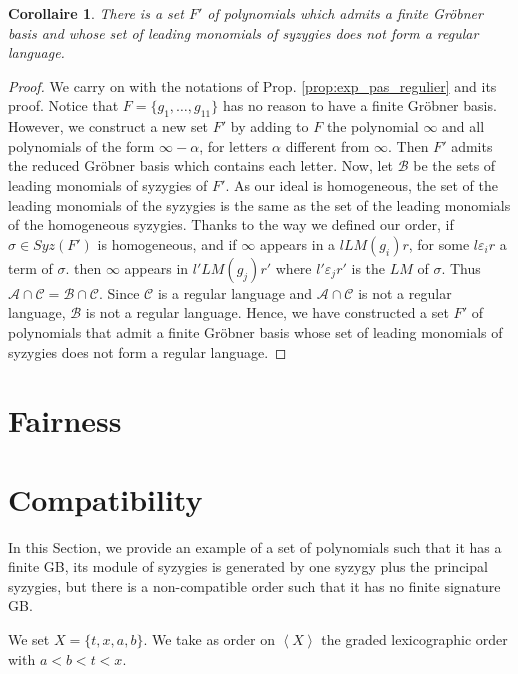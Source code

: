 \documentclass[sigconf]{acmart}
\theoremstyle{plain}
\newtheorem{cor}[lem]{Corollaire}
\theoremstyle{definition}
\theoremstyle{remark}
\newcommand{\LM}{LM}
\begin{document}
\begin{cor}
There is a set $F'$ of polynomials which
admits a finite Gröbner basis
and whose set of leading monomials of syzygies does not form a regular language. 
\end{cor}
\begin{proof}
We carry on with the notations of Prop. \ref{prop:exp_pas_regulier} and
its proof.
Notice that $F=\{g_1,\dots,g_{11}\}$ has no reason to have a finite Gröbner basis. However, we construct a new set $F'$ by adding to $F$ the polynomial $\infty$ and all polynomials of the form $\infty-\alpha$, for letters $\alpha$ different from $\infty$. Then $F'$ admits the reduced Gröbner basis which contains each letter.
Now, let $\mathscr{B}$ be the sets of leading monomials of syzygies of $F'$.
As our ideal is homogeneous,
the set of the
leading monomials of the syzygies
is the same as the set of the leading
monomials of the homogeneous syzygies.
Thanks to the way we defined our order,
if $\sigma \in Syz(F')$ is homogeneous,
and
if $\infty$ appears in a $l \LM(g_i) r$,
for some $l \varepsilon_i r$ 
a term of $\sigma.$ 
then 
$\infty$ appears in $l' \LM(g_j) r'$
where $l' \varepsilon_j r'$ is the $\LM$
of $\sigma.$
Thus $\mathscr{A} \cap \mathscr{C}=\mathscr{B} \cap \mathscr{C}$. Since $\mathscr{C}$ is a regular language and $\mathscr{A} \cap \mathscr{C}$ is not a regular language, $\mathscr{B}$ is not a regular language. Hence, we have constructed a set $F'$ of polynomials that admit a finite Gröbner basis whose set of leading monomials of syzygies does not form a regular language. 
\end{proof}


\section{Fairness}

\section{Compatibility}

In this Section,
we provide an example
of a set of polynomials
such that 
it has a finite GB,
its module of
syzygies is generated
by one syzygy plus
the principal syzygies,
but there is
a non-compatible order
such that it
has no finite signature GB.

We set $X = \{t, x, a, b \}$.
We take as order on 
$\left\langle X \right\rangle$ the 
graded lexicographic order
with $a < b < t < x$.
\end{document}
